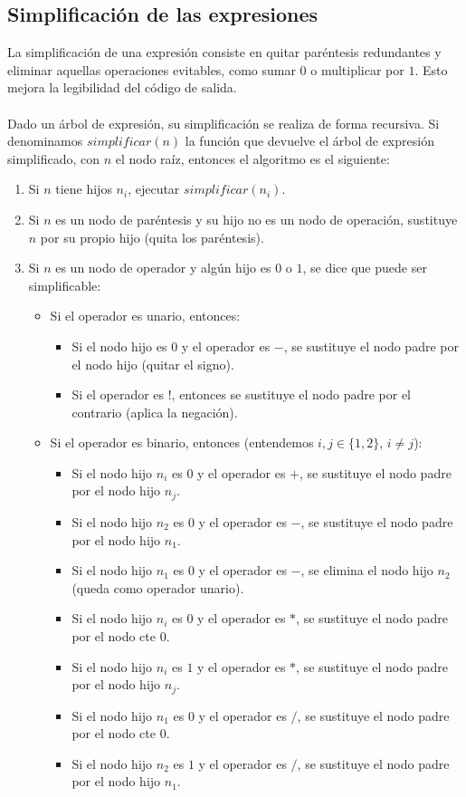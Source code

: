 \subsection*{Simplificación de las expresiones}
La simplificación de una expresión consiste en quitar paréntesis redundantes y eliminar aquellas operaciones evitables, como sumar $0$ o multiplicar por $1$. Esto mejora la legibilidad del código de salida.\\
\\Dado un árbol de expresión, su simplificación se realiza de forma recursiva. Si denominamos $simplificar(n)$ la función que devuelve el árbol de expresión simplificado, con $n$ el nodo raíz, entonces el algoritmo es el siguiente:
\begin{enumerate}
	\item Si $n$ tiene hijos $n_i$, ejecutar $simplificar(n_i)$.
	\item Si $n$ es un nodo de paréntesis y su hijo no es un nodo de operación, sustituye $n$ por su propio hijo (quita los paréntesis).
	\item Si $n$ es un nodo de operador y algún hijo es $0$ o $1$, se dice que puede ser simplificable:
	\begin{itemize}
		\item Si el operador es unario, entonces:
		\begin{itemize}
			\item Si el nodo hijo es $0$ y el operador es $-$, se sustituye el nodo padre por el nodo hijo (quitar el signo).
			\item Si el operador es !, entonces se sustituye el nodo padre por el contrario (aplica la negación).
		\end{itemize}
		\item Si el operador es binario, entonces (entendemos $i,j \in \{1,2\}$, $i \neq j$):
		\begin{itemize}
			\item Si el nodo hijo $n_i$ es $0$ y el operador es $+$, se sustituye el nodo padre por el nodo hijo $n_j$.
			\item Si el nodo hijo $n_2$ es $0$ y el operador es $-$, se sustituye el nodo padre por el nodo hijo $n_1$.
			\item Si el nodo hijo $n_1$ es $0$ y el operador es $-$, se elimina el nodo hijo $n_2$ (queda como operador unario).
			\item Si el nodo hijo $n_i$ es $0$ y el operador es $*$, se sustituye el nodo padre por el nodo cte $0$.
			\item Si el nodo hijo $n_i$ es $1$ y el operador es $*$, se sustituye el nodo padre por el nodo hijo $n_j$.
			\item Si el nodo hijo $n_1$ es $0$ y el operador es $/$, se sustituye el nodo padre por el nodo cte $0$.
			\item Si el nodo hijo $n_2$ es $1$ y el operador es $/$, se sustituye el nodo padre por el nodo hijo $n_1$.
		\end{itemize}
	\end{itemize}
\end{enumerate}

\endinput
